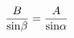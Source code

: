 \documentclass[preview]{standalone}
\begin{document}
\begin{align*}
{ B \over {\rm sin} \beta } = { A \over {\rm sin} \alpha }
\end{align*}
\end{document}
